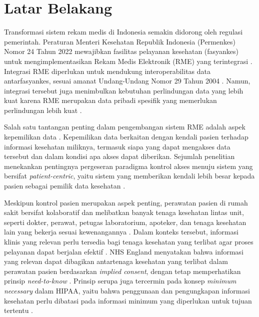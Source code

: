 \section{Latar Belakang}
\label{sec:latarbelakang}

Transformasi sistem rekam medis di Indonesia semakin didorong oleh regulasi pemerintah. Peraturan Menteri Kesehatan Republik Indonesia (Permenkes) Nomor 24 Tahun 2022 mewajibkan fasilitas pelayanan kesehatan (fasyankes) untuk mengimplementasikan Rekam Medis Elektronik (RME) yang terintegrasi \autocite{permenkes24_2022}. Integrasi RME diperlukan untuk mendukung interoperabilitas data antarfasyankes, sesuai amanat Undang-Undang Nomor 29 Tahun 2004 \autocite{uu_29_2004}. Namun, integrasi tersebut juga menimbulkan kebutuhan perlindungan data yang lebih kuat karena RME merupakan data pribadi spesifik yang memerlukan perlindungan lebih kuat \autocite{uu27-2022-pdp}.

Salah satu tantangan penting dalam pengembangan sistem RME adalah aspek kepemilikan data \autocite{liu2025accesscontrol}. Kepemilikan data berkaitan dengan kendali pasien terhadap informasi kesehatan miliknya, termasuk siapa yang dapat mengakses data tersebut dan dalam kondisi apa akses dapat diberikan. Sejumlah penelitian menekankan pentingnya pergeseran paradigma kontrol akses menuju sistem yang bersifat \textit{patient-centric}, yaitu sistem yang memberikan kendali lebih besar kepada pasien sebagai pemilik data kesehatan \autocite{patil2024blockchain,peng2023patientcentric}.

Meskipun kontrol pasien merupakan aspek penting, perawatan pasien di rumah sakit bersifat kolaboratif dan melibatkan banyak tenaga kesehatan lintas unit, seperti dokter, perawat, petugas laboratorium, apoteker, dan tenaga kesehatan lain yang bekerja sesuai kewenangannya \autocite{srinivas2023synergistic,kmk1128_2022}. Dalam konteks tersebut, informasi klinis yang relevan perlu tersedia bagi tenaga kesehatan yang terlibat agar proses pelayanan dapat berjalan efektif \autocite{srinivas2023synergistic}. NHS England menyatakan bahwa informasi yang relevan dapat dibagikan antartenaga kesehatan yang terlibat dalam perawatan pasien berdasarkan \textit{implied consent}, dengan tetap memperhatikan prinsip \textit{need-to-know} \autocite{nhs_consent_2025}. Prinsip serupa juga tercermin pada konsep \textit{minimum necessary} dalam HIPAA, yaitu bahwa penggunaan dan pengungkapan informasi kesehatan perlu dibatasi pada informasi minimum yang diperlukan untuk tujuan tertentu \autocite{HHS_MinimumNecessaryPDF}.


